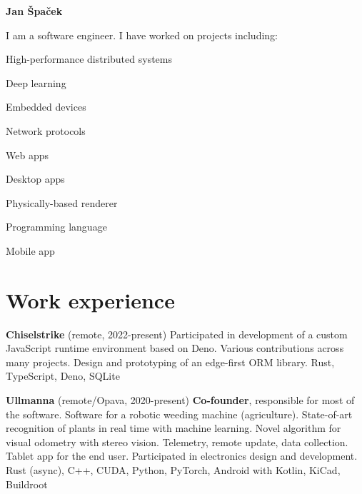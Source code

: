 \documentclass[10pt,a4paper]{article}
\begin{document}
\thispagestyle{empty}
\sffamily

{\bfseries\huge Jan Špaček}

\begin{multicols}{2}

I am a software engineer. I have worked on projects including:
\begin{compactitem}
  \item High-performance distributed systems
  \item Deep learning
  \item Embedded devices
  \item Network protocols
  \item Web apps
  \item Desktop apps
  \item Physically-based renderer
  \item Programming language
  \item Mobile app
\end{compactitem}

\section*{Work experience}

\textbf{Chiselstrike} (remote, 2022-present)
  \newline Participated in development of a custom JavaScript runtime
  environment based on Deno.
  \newline Various contributions across many projects.
  \newline Design and prototyping of an edge-first ORM library.
  \newline Rust, TypeScript, Deno, SQLite

\textbf{Ullmanna} (remote/Opava, 2020-present)
  \newline \textbf{Co-founder}, responsible for most of the software.
  \newline Software for a robotic weeding machine (agriculture).
  \newline State-of-art recognition of plants in real time with machine learning.
  \newline Novel algorithm for visual odometry with stereo vision.
  \newline Telemetry, remote update, data collection.
  \newline Tablet app for the end user.
  \newline Participated in electronics design and development.
  \newline Rust (async), C++, CUDA, Python, PyTorch, Android with Kotlin, KiCad, Buildroot


\end{multicols}
\end{document}
